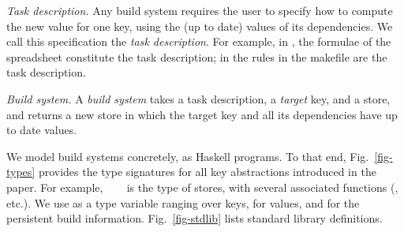 \emph{Task description.} Any build system requires the user to specify how
to compute the new value for one key, using the (up to date) values of its
dependencies. We call this specification the \emph{task description}. For
example, in \Excel, the formulae of the spreadsheet constitute the task
description; in \Make the rules in the makefile are the task description.

\emph{Build system.} A \emph{build system} takes a task description, a
\emph{target} key, and a store, and returns a new store in which the target key
and all its dependencies have up to date values.

We model build systems concretely, as Haskell programs. To that end,
Fig.~\ref{fig-types} provides the type signatures for all key abstractions
introduced in the paper. For example, ~~~ is the
type of stores, with several associated functions (, etc.). We use
 as a type variable ranging over keys,  for values, and  for
the persistent build information. Fig.~\ref{fig-stdlib} lists standard library
definitions.

